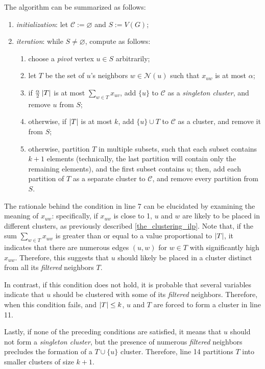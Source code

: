 The algorithm can be summarized as follows:

\begin{enumerate}
    \item \textit{initialization}: let $\mathcal C := \varnothing$ and $S := V(G)$;
    \item \textit{iteration}: while $S \neq \varnothing$, compute as follows:
        \begin{enumerate}
            \item choose a \textit{pivot} vertex $u \in S$ arbitrarily;
            \item let $T$ be the set of $u$'s neighbors $w \in \mathcal N (u)$ such that $x_{uw}$ is at most $\alpha$;
            \item if $\frac{\alpha}{2} \left|T\right|$ is at most $\sum_{w \in T}{x_{uv}}$, add $\{u\}$ to $\mathcal C$ as a \textit{singleton cluster}, and remove $u$ from $S$;
            \item otherwise, if $\left|T\right|$ is at most $k$, add $\{u\} \cup T$ to $\mathcal C$ as a cluster, and remove it from $S$;
            \item otherwise, partition $T$ in multiple subsets, such that each subset contains $k + 1$ elements (technically, the last partition will contain only the remaining elements), and the first subset contains $u$; then, add each partition of $T$ as a separate cluster to $\mathcal C$, and remove every partition from $S$.
        \end{enumerate}
\end{enumerate}

The rationale behind the condition in line 7 can be elucidated by examining the meaning of $x_{uw}$: specifically, if $x_{uw}$ is close to 1, $u$ and $w$ are likely to be placed in different clusters, as previously described \cref{the_clustering_ilp}. Note that, if the sum $\sum_{w \in T}{x_{uw}}$ is greater than or equal to a value proportional to $\left|T\right|$, it indicates that there are numerous edges $(u, w)$ for $w \in T$ with significantly high $x_{uw}$. Therefore, this suggests that $u$ should likely be placed in a cluster distinct from all its \textit{filtered} neighbors $T$.

In contrast, if this condition does not hold, it is probable that several variables indicate that $u$ should be clustered with some of its \textit{filtered} neighbors. Therefore, when this condition fails, and $\left|T\right| \le k$, $u$ and $T$ are forced to form a cluster in line 11.

Lastly, if none of the preceding conditions are satisfied, it means that $u$ should not form a \textit{singleton cluster}, but the presence of numerous \textit{filtered} neighbors precludes the formation of a $T \cup \{u\}$ cluster. Therefore, line 14 partitions $T$ into smaller clusters of size $k + 1$.

